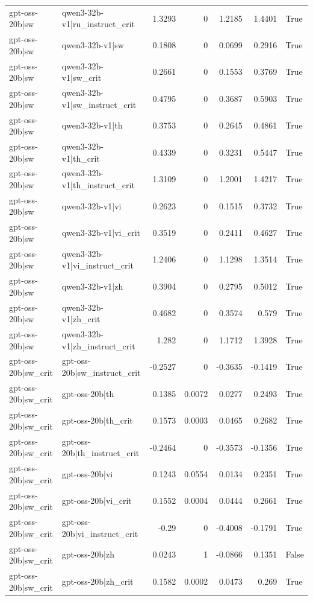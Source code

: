 \begin{table}
\begin{tabular}{l l r r r r l}
gpt-oss-20b|sw & qwen3-32b-v1|ru_instruct_crit & 1.3293 & 0 & 1.2185 & 1.4401 & True \\
gpt-oss-20b|sw & qwen3-32b-v1|sw & 0.1808 & 0 & 0.0699 & 0.2916 & True \\
gpt-oss-20b|sw & qwen3-32b-v1|sw_crit & 0.2661 & 0 & 0.1553 & 0.3769 & True \\
gpt-oss-20b|sw & qwen3-32b-v1|sw_instruct_crit & 0.4795 & 0 & 0.3687 & 0.5903 & True \\
gpt-oss-20b|sw & qwen3-32b-v1|th & 0.3753 & 0 & 0.2645 & 0.4861 & True \\
gpt-oss-20b|sw & qwen3-32b-v1|th_crit & 0.4339 & 0 & 0.3231 & 0.5447 & True \\
gpt-oss-20b|sw & qwen3-32b-v1|th_instruct_crit & 1.3109 & 0 & 1.2001 & 1.4217 & True \\
gpt-oss-20b|sw & qwen3-32b-v1|vi & 0.2623 & 0 & 0.1515 & 0.3732 & True \\
gpt-oss-20b|sw & qwen3-32b-v1|vi_crit & 0.3519 & 0 & 0.2411 & 0.4627 & True \\
gpt-oss-20b|sw & qwen3-32b-v1|vi_instruct_crit & 1.2406 & 0 & 1.1298 & 1.3514 & True \\
gpt-oss-20b|sw & qwen3-32b-v1|zh & 0.3904 & 0 & 0.2795 & 0.5012 & True \\
gpt-oss-20b|sw & qwen3-32b-v1|zh_crit & 0.4682 & 0 & 0.3574 & 0.579 & True \\
gpt-oss-20b|sw & qwen3-32b-v1|zh_instruct_crit & 1.282 & 0 & 1.1712 & 1.3928 & True \\
gpt-oss-20b|sw_crit & gpt-oss-20b|sw_instruct_crit & -0.2527 & 0 & -0.3635 & -0.1419 & True \\
gpt-oss-20b|sw_crit & gpt-oss-20b|th & 0.1385 & 0.0072 & 0.0277 & 0.2493 & True \\
gpt-oss-20b|sw_crit & gpt-oss-20b|th_crit & 0.1573 & 0.0003 & 0.0465 & 0.2682 & True \\
gpt-oss-20b|sw_crit & gpt-oss-20b|th_instruct_crit & -0.2464 & 0 & -0.3573 & -0.1356 & True \\
gpt-oss-20b|sw_crit & gpt-oss-20b|vi & 0.1243 & 0.0554 & 0.0134 & 0.2351 & True \\
gpt-oss-20b|sw_crit & gpt-oss-20b|vi_crit & 0.1552 & 0.0004 & 0.0444 & 0.2661 & True \\
gpt-oss-20b|sw_crit & gpt-oss-20b|vi_instruct_crit & -0.29 & 0 & -0.4008 & -0.1791 & True \\
gpt-oss-20b|sw_crit & gpt-oss-20b|zh & 0.0243 & 1 & -0.0866 & 0.1351 & False \\
gpt-oss-20b|sw_crit & gpt-oss-20b|zh_crit & 0.1582 & 0.0002 & 0.0473 & 0.269 & True \\

\end{tabular}
\end{table}
